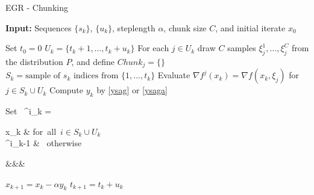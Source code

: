 \documentclass[11pt]{article}
\begin{document}
   \begin{algorithm}
   	[H] 
   	\caption{EGR - Chunking}
   	\label{alg1-chunking}
   	{\bf Input:} Sequences $\{ s_k\}$, $\{ u_k \}$, steplength $ \alpha $, chunk size $C$, and initial iterate $x_0$
   	\begin{algorithmic}
   		[1] 
   		\State Set $t_{0} = 0$
   		\State $U_k =\{t_{k}+1,\ldots, t_{k}+u_k \}$ 
   		\State For each $j \in U_k$ draw $C$ samples $\xi_j^1,\ldots,\xi_j^C$ from the distribution $P$, and define $Chunk_j = \{ \}$
   		\State $S_k = \mbox{sample of } s_k \mbox{ indices from }\{ 1, \ldots ,t_{k}\}$ 
              \State Evaluate $\nabla f^j(x_k) = \nabla f(x_k, \xi_j) $ for $j \in S_k \cup U_k$
              \State Compute $y_k$ by \eqref{ysag} or \eqref{ysaga}
   		\State \begin{flalign} \mbox{Set   }  \phi^i_k =
   		\begin{cases} 
     x_k & \mbox{for all $i \in S_k\cup U_k$ } \\
     \phi^i_{k-1} & \mbox{ otherwise} 
    \end{cases}&&&
   \end{flalign}
   		\State $x_{k+1} = x_k - \alpha y_k$ 
   		\State $t_{k+1} = t_{k} +u_k$ 
   		\EndLoop 
   	\end{algorithmic}
   \end{algorithm}
   
   
\end{document}
